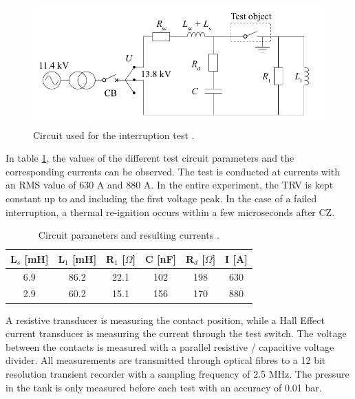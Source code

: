 \documentclass[10pt,a4paper,twoside]{article}
\begin{document}
\begin{figure} [H]
\centering
\includegraphics[scale=0.35]{Bilder/Method/circuit.png}
\caption{Circuit used for the interruption test \cite{bib:AFIMVLBA}.} \label{fig:testCurcuit}
\end{figure}

In table \ref{tab:testParameters}, the values of the different test circuit parameters and the corresponding currents can be observed. The test is conducted at currents with an RMS value of 630 A and 880 A. In the entire experiment, the TRV is kept constant up to and including the first voltage peak. In the case of a failed interruption, a thermal re-ignition occurs within a few microseconds after CZ.

\begin{table}[H]
\center
\caption{Circuit parameters and resulting currents \cite{bib:AFIMVLBA}. }
\begin{tabular}{|c|c|c|c|c|c|}
\hline 
L$_s$ [mH] & L$_1$ [mH] & R$_1$ [$\Omega$] & C [nF] & R$_{d}$ [$\Omega$] & I [A] \\ 
\hline 
6.9 & 86.2 & 22.1 & 102 & 198 & 630 \\ 
\hline
2.9 & 60.2 & 15.1 & 156 & 170 & 880 \\
\hline   
\end{tabular} 
\label{tab:testParameters}
\end{table}

A resistive transducer is measuring the contact position, while a Hall Effect current transducer is measuring the current through the test switch. The voltage between the contacts is measured with a parallel resistive / capacitive voltage divider. All measurements are transmitted through optical fibres to a 12 bit resolution transient recorder with a sampling frequency of 2.5 MHz. The pressure in the tank is only measured before each test with an accuracy of 0.01 bar.
\end{document}
